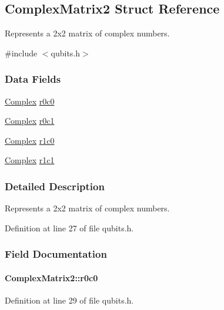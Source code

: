\hypertarget{structComplexMatrix2}{
\subsection{ComplexMatrix2 Struct Reference}
\label{structComplexMatrix2}
}


Represents a 2x2 matrix of complex numbers.  


{\ttfamily \#include $<$qubits.h$>$}\subsubsection*{Data Fields}
\begin{DoxyCompactItemize}
\item 
\hyperlink{structComplex}{Complex} \hyperlink{structComplexMatrix2_ae72b4458233b077a636beee1892e81ff}{r0c0}
\item 
\hyperlink{structComplex}{Complex} \hyperlink{structComplexMatrix2_a0f3932f055a8b05cef361bce25d51172}{r0c1}
\item 
\hyperlink{structComplex}{Complex} \hyperlink{structComplexMatrix2_ab98282015ed2065e53fbc9638e2583ab}{r1c0}
\item 
\hyperlink{structComplex}{Complex} \hyperlink{structComplexMatrix2_a763007c3070802373549ba0350f83c8a}{r1c1}
\end{DoxyCompactItemize}


\subsubsection{Detailed Description}
Represents a 2x2 matrix of complex numbers. 

Definition at line 27 of file qubits.h.

\subsubsection{Field Documentation}
\hypertarget{structComplexMatrix2_ae72b4458233b077a636beee1892e81ff}{
\paragraph[{r0c0}]{ {\bf ComplexMatrix2::r0c0}}\hfill}
\label{structComplexMatrix2_ae72b4458233b077a636beee1892e81ff}


Definition at line 29 of file qubits.h.

